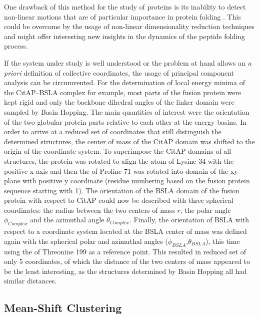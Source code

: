 \documentclass[english, a4paper, 12pt, titlepage, draft]{article}
\begin{document}
One drawback of this method for the study of proteins is its inability to detect non-linear motions that are of particular importance in protein folding \cite{SciMAP}.
This could be overcome by the usage of non-linear dimensionality reduction techniques and might offer interesting new insights in the dynamics of the peptide folding process.



If the system under study is well understood or the problem at hand allows an \emph{a priori} definition of collective coordinates, the usage of principal component analysis can be circumvented.
For the determination of local energy minima of the CitAP--BSLA complex for example, most parts of the fusion protein were kept rigid and only the backbone dihedral angles of the linker domain were sampled by Basin Hopping.
The main quantities of interest were the orientation of the two globular protein parts relative to each other at the energy basins.
In order to arrive at a reduced set of coordinates that still distinguish the determined structures, the center of mass of the CitAP domain was shifted to the origin of the coordinate system.
To superimpose the CitAP domains of all structures, the protein was rotated to align the  atom of Lysine 34 with the positive x-axis and then the  of Proline 71 was rotated into domain of the xy-plane with positive y coordinate (residue numbering based on the fusion protein sequence starting with 1).
The orientation of the BSLA domain of the fusion protein with respect to CitAP could now be described with three spherical coordinates: the radius between the two centers of mass $r$, the polar angle $\phi_{Complex}$ and the azimuthal angle $\theta_{Complex}$.
Finally, the orientation of BSLA with respect to a coordinate system located at the BSLA center of mass was defined again with the spherical polar and azimuthal angles ($\phi_{BSLA}$,$\theta_{BSLA}$), this time using the  of Threonine 199 as a reference point.
This resulted in reduced set of only 5 coordinates, of which the distance of the two centers of mass appeared to be the least interesting, as the structures determined by Basin Hopping all had similar distances.




\subsection{Mean-Shift Clustering}
\label{sec:meanShift}
\end{document}

